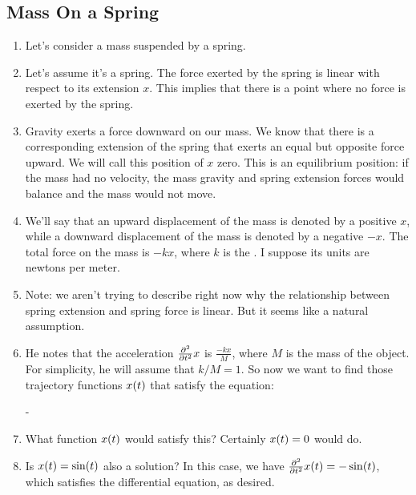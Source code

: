 \subsection{Mass On a Spring}

\begin{enumerate}
  \item Let's consider a mass suspended by a spring.

  \item Let's assume it's a  spring. The force exerted by
  the spring is linear with respect to its extension $x$. This implies
  that there is a point where no force is exerted by the spring.

  \item Gravity exerts a force downward on our mass. We know that there
  is a corresponding extension of the spring that exerts an equal but
  opposite force upward. We will call this position of $x$ zero. This is
  an equilibrium position: if the mass had no velocity, the mass gravity
  and spring extension forces would balance and the mass would not move.

  \item We'll say that an upward displacement of the mass is denoted by
  a positive $x$, while a downward displacement of the mass is denoted
  by a negative $-x$. The total force on the mass is $-kx$, where $k$ is
  the . I suppose its units are newtons per
  meter.

  \item Note: we aren't trying to describe right now why the
  relationship between spring extension and spring force is linear. But
  it seems like a natural assumption.

  \item He notes that the acceleration $\frac{\partial^2 }{\partial {t}^2} x$ is
  $\frac{-kx}{M}$, where $M$ is the mass of the object. For simplicity,
  he will assume that $k/M=1$. So now we want to find those trajectory
  functions $x\mathopen{}\left( {t} \right)\mathclose{}$ that satisfy the equation:

  \begin{nedqn}
     \eqcol - 
  \end{nedqn}

  \item What function $x\mathopen{}\left( {t} \right)\mathclose{}$ would satisfy this? Certainly $x\mathopen{}\left( {t} \right)\mathclose{} = 0$
  would do.

  \item Is $x\mathopen{}\left( {t} \right)\mathclose{} = \sin\mathopen{}\left( {t} \right)\mathclose{}$ also a solution? In this case, we have
  $\frac{\partial^2 }{\partial {t}^2} x\mathopen{}\left( {t} \right)\mathclose{} = -\sin\mathopen{}\left( {t} \right)\mathclose{}$, which satisfies the differential
  equation, as desired.


\end{enumerate}
